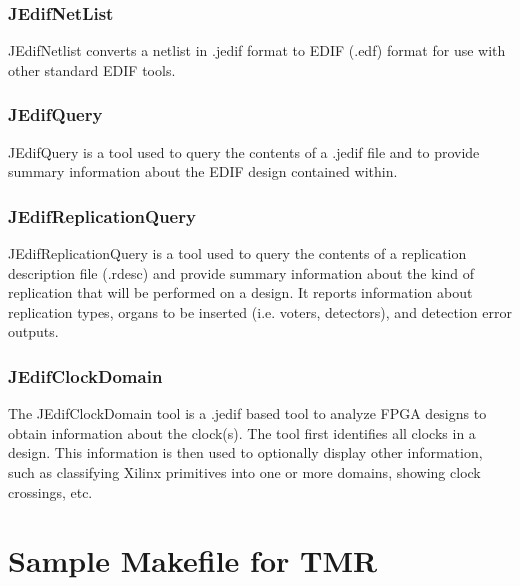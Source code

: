 \documentclass[english]{article}
\numberwithin{figure}{section}
\begin{document}
\subsubsection{JEdifNetList}
JEdifNetlist converts a netlist in .jedif format to EDIF (.edf) format for use
with other standard EDIF tools.

\subsubsection{JEdifQuery}
JEdifQuery is a tool used to query the contents of a .jedif file and
to provide summary information about the EDIF design contained within.

\subsubsection{JEdifReplicationQuery}
JEdifReplicationQuery is a tool used to query the contents of a
replication description file (.rdesc) and provide summary information
about the kind of replication that will be performed on a design. It
reports information about replication types, organs to be inserted
(i.e. voters, detectors), and detection error outputs.

\subsubsection{JEdifClockDomain} 
The JEdifClockDomain tool is a .jedif based tool to analyze FPGA
designs to obtain information about the clock(s). The tool first
identifies all clocks in a design. This information is then used to
optionally display other information, such as classifying Xilinx
primitives into one or more domains, showing clock crossings, etc.

\newpage

\newpage

\newpage

\newpage

\newpage

\newpage

\newpage

\newpage

\newpage

\newpage

\newpage

\newpage

\newpage




\newpage
\section{Sample Makefile for TMR}
\newpage
\end{document}
